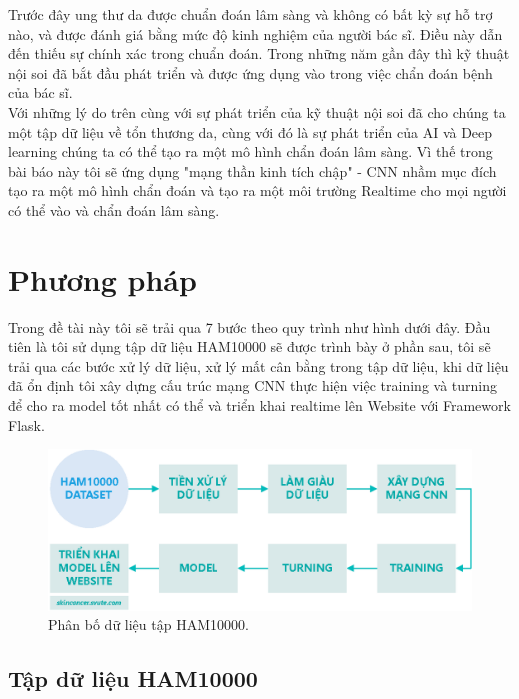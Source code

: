 \documentclass[12pt,a4paper]{article}
\begin{document}
	\noindent
	Trước đây ung thư da được chuẩn đoán lâm sàng và không có bất kỳ sự hỗ trợ nào, và được đánh giá bằng mức độ kinh nghiệm của người bác sĩ. Điều này dẫn đến thiếu sự chính xác trong chuẩn đoán. Trong những năm gần đây thì kỹ thuật nội soi đã bắt đầu phát triển và được ứng dụng vào  trong việc chẩn đoán bệnh của bác sĩ.\\
	
	\noindent
	Với những lý do trên cùng với sự phát triển của kỹ thuật nội soi đã cho chúng ta một tập dữ liệu về tổn thương da, cùng với đó là sự phát triển của AI và Deep learning chúng ta có thể tạo ra một mô hình chẩn đoán lâm sàng. Vì thế trong bài báo này tôi sẽ ứng dụng "mạng thần kinh tích chập" - CNN nhầm mục đích tạo ra một mô hình chẩn đoán và tạo ra một môi trường Realtime cho mọi người có thể vào và chẩn đoán lâm sàng.
	
	
	\section{Phương pháp}
	
	Trong đề tài này tôi sẽ trải qua 7 bước theo quy trình như hình dưới đây. Đầu tiên là tôi sử dụng tập dữ liệu HAM10000 sẽ được trình bày ở phần sau, tôi sẽ trải qua các bước xử lý dữ liệu, xử lý mất cân bằng trong tập dữ liệu, khi dữ liệu đã ổn định tôi xây dựng cấu trúc mạng CNN thực hiện việc training và turning để cho ra model tốt nhất có thể và triển khai realtime lên Website với Framework Flask.
	
	\begin{figure}[h!]
		\centering
		\includegraphics[width=\linewidth]{./images/quatrinh.eps}
		\caption{Phân bố dữ liệu tập HAM10000.}
		\label{fig:quatrinh}
	\end{figure}
	
	\subsection{Tập dữ liệu HAM10000}
	
\end{document}
